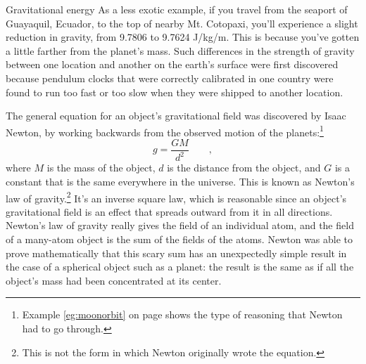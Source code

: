 \begin{envsubsection}{Gravitational energy}
As a less exotic example, if you travel from the seaport of
Gua\-ya\-quil, Ecuador, to the top of nearby Mt. Cotopaxi, you'll experience
a slight reduction in gravity, from 9.7806 to 9.7624 J/kg/m. This is because
you've gotten a little farther from the planet's mass. Such differences in the
strength of gravity between one location and another on the earth's surface were
first discovered because pendulum clocks that were correctly calibrated in one country
were found to run too fast or too slow when they were shipped to another location.

\pagebreak[4]

The general equation for an object's gravitational field was discovered by
Isaac Newton, by working backwards
from the observed motion of the planets:\footnote{Example \ref{eg:moonorbit} on page \pageref{eg:moonorbit} shows
the type of reasoning that Newton had to go through.}
\begin{equation*}
	g = \frac{GM}{d^2} \qquad ,
\end{equation*}
where $M$ is the mass of the object, $d$ is the distance from the object, and $G$ is
a constant that is the same everywhere in the universe. This is known as Newton's
law of gravity.\footnote{This is not the form
in which Newton originally wrote the equation.}
It's an inverse square law, which is reasonable since an object's gravitational
field is an effect that spreads outward from it in all directions.
Newton's law of gravity really gives the field of an individual atom, and
the field of a many-atom object is the sum of the fields of the atoms.
Newton was able to prove mathematically that this scary sum has an unexpectedly
simple result in the case of a spherical object such as a planet: the result is
the same as if all the object's mass had been concentrated at its center.


\end{envsubsection}
